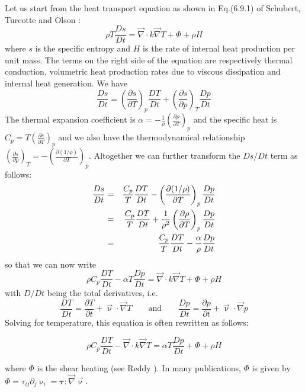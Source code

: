Let us start from the heat transport equation as shown in Eq.(6.9.1)
of Schubert, Turcotte and Olson \cite{scto01}:
\begin{equation}
\rho T \frac{Ds}{Dt} = {\vec \nabla} \cdot k {\vec \nabla} T + \Phi + \rho H  
\end{equation}
where $s$ is the specific entropy and $H$ is the rate of internal heat production
per unit mass. The terms on the right side of the equation are respectively
thermal conduction, volumetric heat production rates
due to viscous dissipation and internal heat generation.
We have 
\[
\frac{Ds}{Dt} = 
\left( \frac{\partial s}{\partial T} \right)_p \frac{DT}{Dt}
+
\left( \frac{\partial s}{\partial p} \right)_T \frac{Dp}{Dt}
\]
The thermal expansion coefficient is
$\alpha = -\frac{1}{\rho} \left(\frac{\partial \rho}{\partial T} \right)_p$
and the specific heat is 
$C_p = T \left( \frac{\partial s}{\partial T} \right)_p$
and we also have the thermodynamical relationship
$
\left( \frac{\partial s}{\partial p}  \right)_T
=
-\left( \frac{\partial (1/\rho)}{\partial T}  \right)_p
$. 
Altogether we can further transform the $Ds/Dt$ term as follows:
\begin{eqnarray}
\frac{Ds}{Dt} 
&=& 
\frac{C_p}{T}\frac{DT}{Dt}-\left( \frac{\partial (1/\rho)}{\partial T}  \right)_p \frac{Dp}{Dt} \nonumber\\
&=& 
\frac{C_p}{T}\frac{DT}{Dt}+\frac{1}{\rho^2} \left( \frac{\partial \rho}{\partial T}\right)_p\frac{Dp}{Dt}\nonumber\\
&=& 
\frac{C_p}{T}\frac{DT}{Dt} - \frac{\alpha}{\rho} \frac{Dp}{Dt}\nonumber
\end{eqnarray}
so that we can now write
\begin{equation}
\rho C_p \frac{DT}{Dt} - \alpha T \frac{Dp}{Dt} = {\vec \nabla} \cdot k {\vec \nabla} T + \Phi + \rho H  
\end{equation}
with $D/Dt$ being the total derivatives, i.e. 
\begin{equation}
\frac{DT}{Dt} = \frac{\partial T}{\partial t} + {\vec \upnu}\cdot {\vec \nabla}T
\qquad
\text{and}
\qquad
\frac{Dp}{Dt} = \frac{\partial p}{\partial t} + {\vec \upnu}\cdot {\vec \nabla}p
\end{equation}
Solving for temperature, this equation is often rewritten as follows:
\begin{mdframed}[backgroundcolor=blue!5]
\begin{equation}
\rho C_p \frac{DT}{Dt} - {\vec \nabla} \cdot k {\vec \nabla} T =  \alpha T \frac{Dp}{Dt} + \Phi + \rho H  
\end{equation}
\end{mdframed}
where $\Phi$ is the shear heating (see Reddy \cite[p287]{reddybook2}). 
In many publications, $\Phi$ is given by 
$\Phi=\tau_{ij}\partial_j \upnu_i={\bm \tau}:{\vec \nabla}{\vec \upnu}$.

